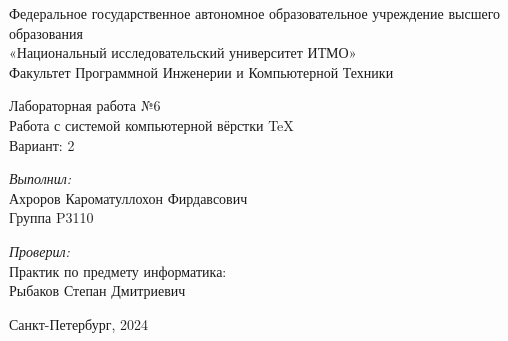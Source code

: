 \newpage
\fancyfoot[R]{\thepage} 
\pagecolor[rgb]{1,1,1}
\begin{center}
\Large Федеральное государственное автономное образовательное учреждение высшего образования\\ «Национальный исследовательский университет ИТМО»\\
Факультет Программной Инженерии и Компьютерной Техники\\
\hfill 


\vspace{7cm}
\Large Лабораторная работа №6 \\
Работа с системой компьютерной вёрстки \TeX\\
Вариант: 2\\
\end{center}

\vspace{7.5cm}
 
\begin{flushright}
\textit{Выполнил:}\\
Ахроров Кароматуллохон Фирдавсович\\
Группа P3110\

\textit{Проверил:}\\
Практик по предмету информатика:\\
Рыбаков Степан Дмитриевич\\
\end{flushright}
 
\vfill

\begin{center} Санкт-Петербург, 2024 \end{center}
